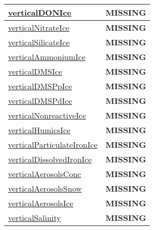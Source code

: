 {\begin{center}
\begin{longtable}{| p{2.0in} | p{4.0in} |}
    \hline
    \hyperref[subsec:var_sec_tracers_verticalDONIce]{verticalDONIce} & {\bf \color{red} MISSING} \\
    \hline
    \hyperref[subsec:var_sec_tracers_verticalNitrateIce]{verticalNitrateIce} & {\bf \color{red} MISSING} \\
    \hline
    \hyperref[subsec:var_sec_tracers_verticalSilicateIce]{verticalSilicateIce} & {\bf \color{red} MISSING} \\
    \hline
    \hyperref[subsec:var_sec_tracers_verticalAmmoniumIce]{verticalAmmoniumIce} & {\bf \color{red} MISSING} \\
    \hline
    \hyperref[subsec:var_sec_tracers_verticalDMSIce]{verticalDMSIce} & {\bf \color{red} MISSING} \\
    \hline
    \hyperref[subsec:var_sec_tracers_verticalDMSPpIce]{verticalDMSPpIce} & {\bf \color{red} MISSING} \\
    \hline
    \hyperref[subsec:var_sec_tracers_verticalDMSPdIce]{verticalDMSPdIce} & {\bf \color{red} MISSING} \\
    \hline
    \hyperref[subsec:var_sec_tracers_verticalNonreactiveIce]{verticalNonreactiveIce} & {\bf \color{red} MISSING} \\
    \hline
    \hyperref[subsec:var_sec_tracers_verticalHumicsIce]{verticalHumicsIce} & {\bf \color{red} MISSING} \\
    \hline
    \hyperref[subsec:var_sec_tracers_verticalParticulateIronIce]{verticalParticulateIronIce} & {\bf \color{red} MISSING} \\
    \hline
    \hyperref[subsec:var_sec_tracers_verticalDissolvedIronIce]{verticalDissolvedIronIce} & {\bf \color{red} MISSING} \\
    \hline
    \hyperref[subsec:var_sec_tracers_verticalAerosolsConc]{verticalAerosolsConc} & {\bf \color{red} MISSING} \\
    \hline
    \hyperref[subsec:var_sec_tracers_verticalAerosolsSnow]{verticalAerosolsSnow} & {\bf \color{red} MISSING} \\
    \hline
    \hyperref[subsec:var_sec_tracers_verticalAerosolsIce]{verticalAerosolsIce} & {\bf \color{red} MISSING} \\
    \hline
    \hyperref[subsec:var_sec_tracers_verticalSalinity]{verticalSalinity} & {\bf \color{red} MISSING} \\
    \hline
\end{longtable}
\end{center}
}
